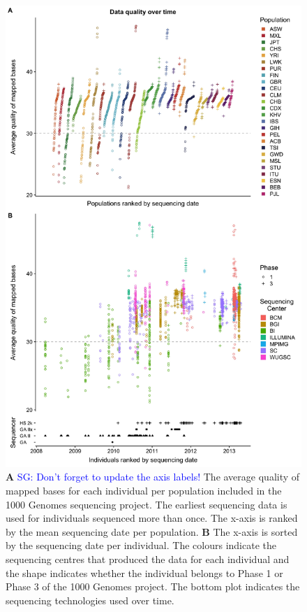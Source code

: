 \documentclass[9pt,lineno]{elife}
\newcommand{\sgcomment}[1]{\textcolor{blue}{SG: #1}}
\begin{document}
\begin{figure}
\includegraphics[width=\hsize,keepaspectratio]{./Figures/MapQualOverTime.jpg}

\caption{\textbf{A} \sgcomment{Don't forget to update the axis labels!} The average quality of mapped bases for each individual per population included in the 1000 Genomes sequencing project. The earliest sequencing data is used for individuals sequenced more than once. The x-axis is ranked by the mean sequencing date per population. \textbf{B} The x-axis is sorted by the sequencing date per individual. The colours indicate the sequencing centres that produced the data for each individual and the shape indicates whether the individual belongs to Phase 1 or Phase 3 of the 1000 Genomes project. The bottom plot indicates the sequencing technologies used over time.}
\label{MapQual}
\end{figure}
\end{document}
